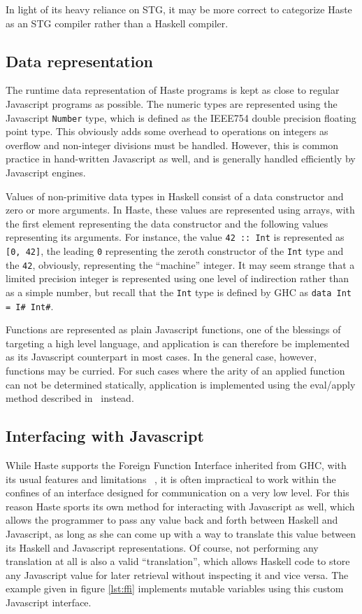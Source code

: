 \documentclass[preprint]{sigplanconf}
\begin{document}
In light of its heavy reliance on STG, it may be more correct to categorize
Haste as an STG compiler rather than a Haskell compiler.

\subsection{Data representation}

The runtime data representation of Haste programs is kept as close to regular
Javascript programs as possible. The numeric types are represented using the
Javascript \lstinline!Number! type, which is defined as the IEEE754 double
precision floating point type. This obviously adds some overhead to operations
on integers as overflow and non-integer divisions must be handled. However, this
is common practice in hand-written Javascript as well, and is generally handled
efficiently by Javascript engines.

Values of non-primitive data types in Haskell consist of a data constructor and
zero or more arguments. In Haste, these values are represented using arrays,
with the first element representing the data constructor and the following
values representing its arguments. For instance, the value \lstinline!42 :: Int!
is represented as \lstinline![0, 42]!, the leading \lstinline!0! representing
the zeroth constructor of the \lstinline!Int! type and the \lstinline!42!,
obviously, representing the ``machine'' integer. It may seem strange that a
limited precision integer is represented using one level of indirection rather
than as a simple number, but recall that the \lstinline!Int! type is defined by
GHC as \lstinline!data Int = I# Int#!.

Functions are represented as plain Javascript functions, one of the blessings
of targeting a high level language, and application is can therefore be
implemented as its Javascript counterpart in most cases. In the general case,
however, functions may be curried. For such cases where the arity of an applied
function can not be determined statically, application is implemented using the
eval/apply method described in\ \cite{fastcurry} instead.

\subsection{Interfacing with Javascript}

While Haste supports the Foreign Function Interface inherited from GHC, with
its usual features and limitations \ \cite{ffi}, it is often impractical to
work within the confines of an interface designed for communication on a very
low level. For this reason Haste sports its own method for interacting with
Javascript as well, which allows the programmer to pass any value back and
forth between Haskell and Javascript, as long as she can come up with a way to
translate this value between its Haskell and Javascript representations.
Of course, not performing any translation at all is also a valid
``translation'', which allows Haskell code to store any Javascript value for
later retrieval without inspecting it and vice versa. The example given in
figure \ref{lst:ffi} implements mutable variables using this custom Javascript
interface.
\end{document}

